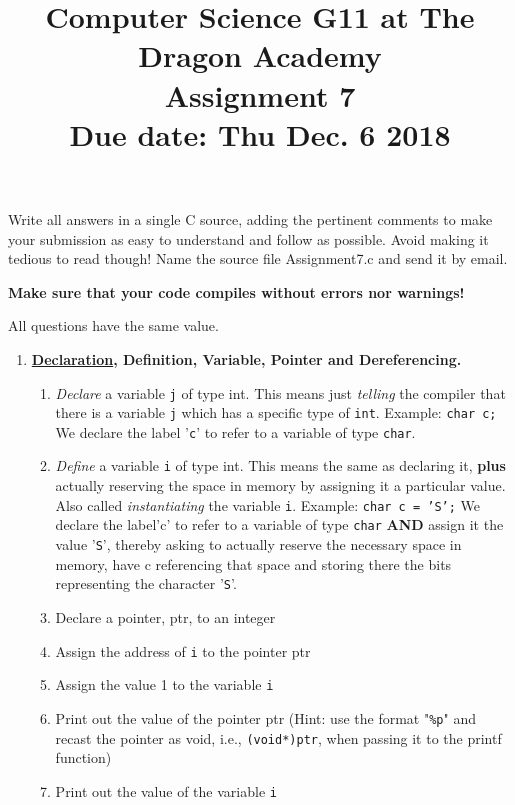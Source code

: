 \documentclass{article}
\title{
Computer Science G11 at The Dragon Academy\\
Assignment 7 \\
\textbf{Due date: Thu Dec. 6 2018}
}
\author{}
\begin{document}
\maketitle

Write all answers in a single C source, adding the pertinent comments to make your submission as easy to understand and follow as possible. Avoid making it tedious to read though!
Name the source file Assignment7.c and send it by email. 

\textbf{Make sure that your code compiles without errors nor warnings!}

All questions have the same value.

\begin{enumerate}
	\item  \textbf{\href{https://stackoverflow.com/questions/1410563/what-is-the-difference-between-a-definition-and-a-declaration}{Declaration}, Definition, Variable, Pointer and Dereferencing.}	
    \begin{enumerate}[label=\arabic*]
        \item \textit{Declare} a variable \texttt{j} of type int. This means just \textit{telling} the compiler that there is a variable \texttt{j} which has a specific type of \texttt{int}.
            Example: \texttt{char c;} We declare the label '\texttt{c}' to refer to a variable of type \texttt{char}.
		\item \textit{Define} a variable \texttt{i} of type int. This means the same as declaring it, \textbf{plus} actually reserving the space in memory by assigning it a particular value. 
					Also called \textit{instantiating} the variable \texttt{i}. 
					Example: \texttt{char c = 'S';} We declare the label'c' to refer to a variable of type \texttt{char} \textbf{AND} assign it the value '\texttt{S}', 
					thereby asking to actually reserve the necessary space in memory, have c referencing that space and storing there the bits representing the character '\texttt{S}'.
		\item Declare a pointer, ptr, to an integer
		\item Assign the address of \texttt{i} to the pointer ptr
		\item Assign the value 1 to the variable \texttt{i}
		\item Print out the value of the pointer ptr (Hint: use the format "\texttt{\%p}" and recast the pointer as void, i.e., \texttt{(void*)ptr}, when passing it to the printf function)
		\item Print out the value of the variable \texttt{i}

\end{enumerate}
\end{enumerate}
\end{document}
